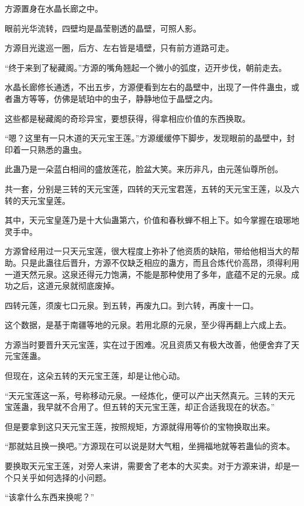 
\begin{this_body}

方源置身在水晶长廊之中。

眼前光华流转，四壁均是晶莹剔透的晶壁，可照人影。

方源目光逡巡一圈，后方、左右皆是墙壁，只有前方道路可走。

“终于来到了秘藏阁。”方源的嘴角翘起一个微小的弧度，迈开步伐，朝前走去。

水晶长廊修长通透，不出五步，方源便看到左右的晶壁中，出现了一件件蛊虫，或者蛊方等等，仿佛是琥珀中的虫子，静静地位于晶壁之内。

这些都是秘藏阁的奇珍异宝，要想获得，得拿相应价值的东西换取。

“嗯？这里有一只木道的天元宝王莲。”方源缓缓停下脚步，发现眼前的晶壁中，封印着一只熟悉的蛊虫。

此蛊乃是一朵蓝白相间的盛放莲花，脸盆大笑。来历非凡，由元莲仙尊所创。

共一套，分别是三转的天元宝莲，四转的天元宝君莲，五转的天元宝王莲，以及六转的天元宝皇莲。

其中，天元宝皇莲乃是十大仙蛊第六，价值和春秋蝉不相上下。如今掌握在琅琊地灵手中。

方源曾经用过一只天元宝莲，很大程度上弥补了他资质的缺陷，带给他相当大的帮助。只是此蛊往后晋升，方源不仅缺乏相应的蛊方，而且合炼代价高昂，须得利用一道天然元泉。这泉还得元力饱满，不能是那种使用了多年，底蕴不足的元泉。成功之后，这道元泉就彻底废掉。

四转元莲，须废七口元泉。到五转，再废九口。到六转，再废十一口。

这个数据，是基于南疆等地的元泉。若用北原的元泉，至少得再翻上六成上去。

方源当时要晋升天元宝莲，实在过于困难。况且资质又有极大改善，他便舍弃了天元宝莲蛊。

但现在，这朵五转的天元宝王莲，却是让他心动。

“天元宝莲这一系，号称移动元泉。一经炼化，便可以产出天然真元。三转的天元宝莲蛊，我早就不合用了。但五转的天元宝王莲，却正合适我现在的状态。”

但是要拿到这只天元宝王莲，按照规矩，方源就得用等价的宝物换取出来。

“那就姑且换一换吧。”方源现在可以说是财大气粗，坐拥福地就等若蛊仙的资本。

要换取天元宝王莲，对旁人来讲，需要舍了老本的大买卖。对于方源来讲，却是一个只关乎如何选择的小问题。

“该拿什么东西来换呢？”


\end{this_body}
